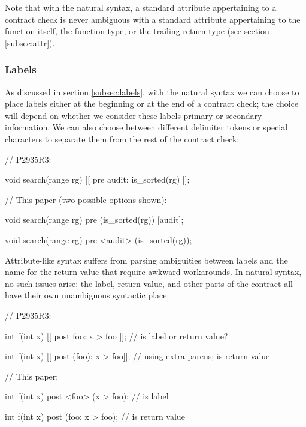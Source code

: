 Note that with the natural syntax, a standard attribute appertaining to a contract check is never ambiguous with a standard attribute appertaining to the function itself, the function type, or the trailing return type (see section \ref{subsec:attr}).

\subsubsection{Labels}

As discussed in section \ref{subsec:labels}, with the natural syntax we can choose to place labels either at the beginning or at the end of a contract check; the choice will depend on whether we consider these labels primary or secondary information. We can also choose between different delimiter tokens or special characters to separate them from the rest of the contract check:

\begin{minipage}[t]{8cm}
\begin{codeblock}
// P2935R3:

void search(range rg)
  [[ pre audit: is_sorted(rg) ]];
\end{codeblock}
\end{minipage}
\begin{minipage}[t]{8cm}
\begin{codeblock}
// This paper (two possible options shown):

void search(range rg)
  pre (is_sorted(rg)) [audit];
  
void search(range rg)
  pre <audit> (is_sorted(rg));
\end{codeblock}
\end{minipage}

Attribute-like syntax suffers from parsing ambiguities between labels and the name for the return value that require awkward workarounds. In natural syntax, no such issues arise: the label, return value, and other parts of the contract all have their own unambiguous syntactic place:

\begin{minipage}[t]{8cm}
\begin{codeblock}
// P2935R3:

int f(int x)
  [[ post foo: x > foo ]];  
  // is  label or return value?

int f(int x)
  [[ post (foo): x > foo]];  
  // using extra parens;  is return value
\end{codeblock}
\end{minipage}
\begin{minipage}[t]{8cm}
\begin{codeblock}
// This paper:

int f(int x)
  post <foo> (x > foo);
  //  is label

int f(int x)
  post (foo: x > foo);
  //  is return value
\end{codeblock}
\end{minipage}

